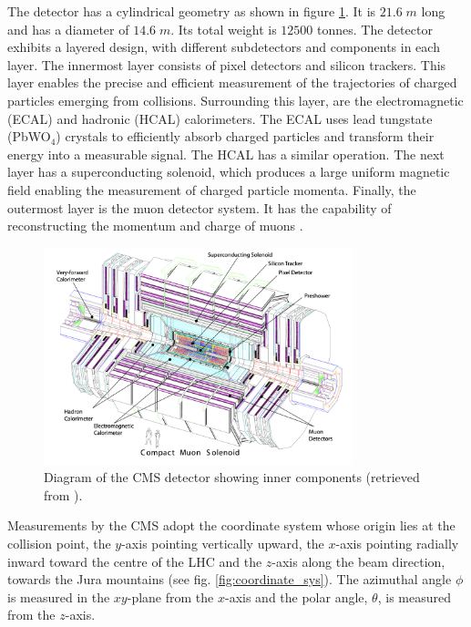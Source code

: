 The detector has a cylindrical geometry as shown in figure \ref{fig:cms-detector}. It is $21.6\;\si{m}$ long and has a diameter of $14.6\;\si{m}$. Its total weight is $12500$ tonnes. The detector exhibits a layered design, with different subdetectors and components in each layer. The innermost layer consists of pixel detectors and silicon trackers. This layer enables the precise and efficient measurement of the trajectories of charged particles emerging from collisions. Surrounding this layer, are the electromagnetic (ECAL) and hadronic (HCAL) calorimeters. The ECAL uses lead tungstate (PbWO$_4$) crystals to efficiently absorb charged particles and transform their energy into a measurable signal. The HCAL has a similar operation. The next layer has a superconducting solenoid, which produces a large uniform magnetic field enabling the measurement of charged particle momenta. Finally, the outermost layer is the muon detector system. It has the capability of reconstructing the momentum and charge of muons \cite{CMS_experiment}.

\begin{figure}
    \centering
    \includegraphics[width = 0.8\textwidth]{images/cms-detector.png}
    \caption{Diagram of the CMS detector showing inner components (retrieved from \cite{CMS_experiment}).}
    \label{fig:cms-detector}
\end{figure}

Measurements by the CMS adopt the coordinate system whose origin lies at the collision point, the $y$-axis pointing vertically upward, the $x$-axis pointing radially inward toward the centre of the LHC and the $z$-axis along the beam direction, towards the Jura mountains (see fig. \ref{fig:coordinate_sys}). The azimuthal angle $\phi$ is measured in the $xy$-plane from the $x$-axis and the polar angle, $\theta$, is measured from the $z$-axis.

